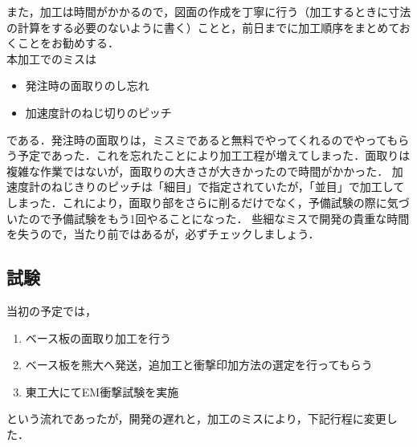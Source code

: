 また，加工は時間がかかるので，図面の作成を丁寧に行う（加工するときに寸法の計算をする必要のないように書く）ことと，前日までに加工順序をまとめておくことをお勧めする．\\
本加工でのミスは
\begin{itemize}
\item 発注時の面取りのし忘れ
\item 加速度計のねじ切りのピッチ
\end{itemize}
である．発注時の面取りは，ミスミであると無料でやってくれるのでやってもらう予定であった．これを忘れたことにより加工工程が増えてしまった．面取りは複雑な作業ではないが，面取りの大きさが大きかったので時間がかかった．
加速度計のねじきりのピッチは「細目」で指定されていたが，「並目」で加工してしまった．これにより，面取り部をさらに削るだけでなく，予備試験の際に気づいたので予備試験をもう1回やることになった．
些細なミスで開発の貴重な時間を失うので，当たり前ではあるが，必ずチェックしましょう．
\subsection{試験}
当初の予定では，
\begin{enumerate}
	\item ベース板の面取り加工を行う
	\item ベース板を熊大へ発送，追加工と衝撃印加方法の選定を行ってもらう
	\item 東工大にてEM衝撃試験を実施
\end{enumerate}
という流れであったが，開発の遅れと，加工のミスにより，下記行程に変更した．
